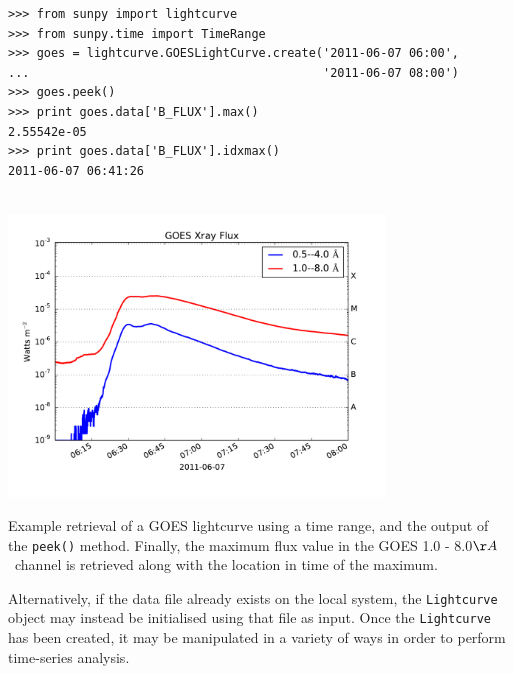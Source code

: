 \begin{listing}[H]
\begin{verbatim}
>>> from sunpy import lightcurve
>>> from sunpy.time import TimeRange
>>> goes = lightcurve.GOESLightCurve.create('2011-06-07 06:00',
...                                         '2011-06-07 08:00')
>>> goes.peek()
>>> print goes.data['B_FLUX'].max()
2.55542e-05
>>> print goes.data['B_FLUX'].idxmax()
2011-06-07 06:41:26


\end{verbatim}
\begin{center}
\includegraphics[width=10cm]{goes_lightcurve.pdf}
\end{center}
\caption{Example retrieval of a GOES lightcurve
using a time range, and the output of the 
\texttt{peek()} method. Finally, the maximum flux value in the GOES 1.0 - 8.0$\AA$\ channel is retrieved along with the location in time of the maximum.}
\label{code:goes_lc}
\end{listing}

Alternatively, if the data file already exists on the local system, the 
\texttt{Lightcurve} object may instead be initialised using that file as input.
Once the \texttt{Lightcurve} has been created, it may be manipulated in 
a variety of ways in order to perform time-series analysis.

